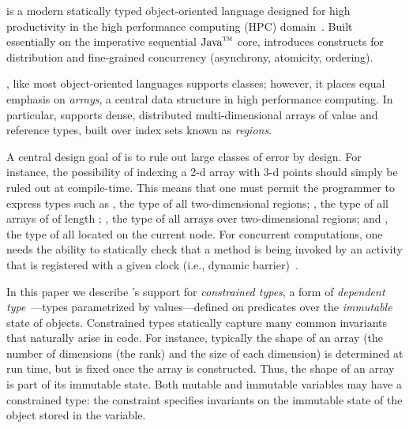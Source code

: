 
%

%
%
%

\Xten{} is a modern statically typed object-oriented
language designed for high productivity in the high performance
computing (HPC) domain~\cite{X10}. Built essentially on the
imperative sequential $\mbox{Java}^{\mbox{\scriptsize\sc tm}}$
core, \Xten{} introduces constructs for distribution and
fine-grained concurrency (asynchrony, atomicity, ordering).

\Xten{}, like most object-oriented languages supports classes;
however, it places
equal emphasis on {\em arrays}, a central data structure in high
performance computing.
In particular, \Xten{} supports dense,
distributed multi-dimensional arrays of value and reference types,
built over index sets known as {\em regions}.%

A central design goal of \Xten{} is to rule out large classes of error
by design. For instance, the possibility of indexing a 2-d array with 3-d
points should simply be ruled out at compile-time. This means that one
must permit the programmer to express types such as ,
the type of all two-dimensional regions; , the
type of all arrays of  of length ; , the type of all  arrays over two-dimensional regions; and
, the type of all  located on the
current node. For concurrent computations, one needs the ability to
statically check that a method is being invoked by an activity that is
registered with a given clock (i.e., dynamic barrier)~\cite{X10}.

In this paper we describe {\Xten}'s support for {\em
constrained types},
a form of {\em dependent
type}~\cite{dependent-types,xi99dependent,ocrz-ecoop03,aspinall-attapl,cayenne,epigram-matter,calc-constructions}---types parametrized by values---defined 
on predicates over the {\em immutable}
state of objects. Constrained types statically capture many common invariants
that naturally arise in code. For instance, typically the shape of an
array (the number of dimensions (the rank) and the size of each dimension)
is determined at
run time, but is fixed once the array is constructed. Thus, the shape of an
array is part of its immutable state.
Both mutable and immutable variables may have a constrained
type: the constraint specifies invariants on the immutable state
of the object stored in the variable. 

